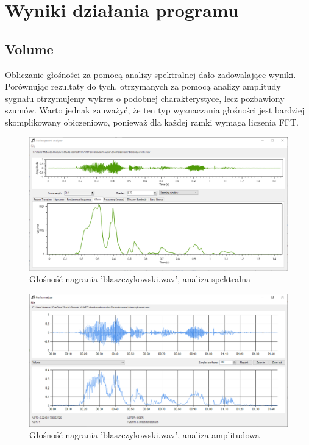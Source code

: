 \documentclass{article}
\begin{document}
\section{Wyniki działania programu}

\subsection{Volume}
Obliczanie głośności za pomocą analizy spektralnej dało zadowalające wyniki. Porównując rezultaty do tych, otrzymanych za pomocą analizy amplitudy sygnału otrzymujemy wykres o podobnej charakterystyce, lecz pozbawiony szumów. Warto jednak zauważyć, że ten typ wyznaczania głośności jest bardziej skomplikowany obiczeniowo, ponieważ dla każdej ramki wymaga liczenia FFT.

\begin{figure}[H]
\includegraphics[width=6in]{scr2.png}
\centering
\caption{Głośność nagrania 'blaszczykowski.wav', analiza spektralna}
\end{figure}

\begin{figure}[H]
\includegraphics[width=6in]{scr3.png}
\centering
\caption{Głośność nagrania 'blaszczykowski.wav', analiza amplitudowa}
\end{figure}
\end{document}
